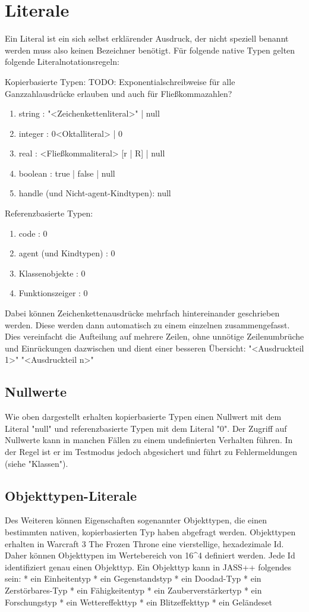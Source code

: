 \chapter{Literale}
Ein Literal ist ein sich selbst erklärender Ausdruck, der nicht speziell benannt werden muss also keinen Bezeichner benötigt.
Für folgende native Typen gelten folgende Literalnotationsregeln:

Kopierbasierte Typen:
TODO: Exponentialschreibweise für alle Ganzzahlausdrücke erlauben und auch für Fließkommazahlen?
\begin{enumerate}
\item string : "<Zeichenkettenliteral>" | null
\item integer : 0<Oktalliteral> | 0%
\item real : <Fließkommaliteral> [r | R] | null
\item boolean : true | false | null
\item handle (und Nicht-agent-Kindtypen): null
\end{enumerate}

Referenzbasierte Typen:
\begin{enumerate}
\item code : 0
\item agent (und Kindtypen) : 0
\item Klassenobjekte : 0
\item Funktionszeiger : 0
\end{enumerate}

Dabei können Zeichenkettenausdrücke mehrfach hintereinander geschrieben werden. Diese werden dann automatisch zu einem einzelnen
zusammengefasst. Dies vereinfacht die Aufteilung auf mehrere Zeilen, ohne unnötige Zeilenumbrüche und Einrückungen dazwischen und
dient einer besseren Übersicht:
"<Ausdruckteil 1>"
"<Ausdruckteil n>"

\section{Nullwerte}
Wie oben dargestellt erhalten kopierbasierte Typen einen Nullwert mit dem Literal "null" und referenzbasierte Typen mit dem Literal "0".
Der Zugriff auf Nullwerte kann in manchen Fällen zu einem undefinierten Verhalten führen.
In der Regel ist er im Testmodus jedoch abgesichert und führt zu Fehlermeldungen (siehe "Klassen").

\section{Objekttypen-Literale}
Des Weiteren können Eigenschaften sogenannter Objekttypen, die einen bestimmten nativen, kopierbasierten Typ haben abgefragt werden.
Objekttypen erhalten in Warcraft 3 The Frozen Throne eine vierstellige, hexadezimale Id. Daher können Objekttypen im Wertebereich von 16^4 definiert werden.
Jede Id identifiziert genau einen Objekttyp.
Ein Objekttyp kann in JASS++ folgendes sein:
* ein Einheitentyp
* ein Gegenstandstyp
* ein Doodad-Typ
* ein Zerstörbares-Typ
* ein Fähigkeitentyp
* ein Zauberverstärkertyp
* ein Forschungstyp
* ein Wettereffekttyp
* ein Blitzeffekttyp
* ein Geländeset

